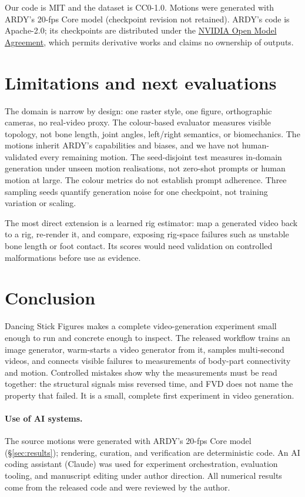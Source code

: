\documentclass[11pt]{article}
\begin{document}
Our code is MIT and the dataset is CC0-1.0. Motions were generated with ARDY's 20-fps Core model (checkpoint
revision not retained). ARDY's code is Apache-2.0; its checkpoints are distributed under the
\href{https://www.nvidia.com/en-us/agreements/enterprise-software/nvidia-open-model-agreement/}{NVIDIA Open
Model Agreement}, which permits derivative works and claims no ownership of outputs.

\section{Limitations and next evaluations}\label{sec:future}
The domain is narrow by design: one raster style, one figure, orthographic cameras, no real-video proxy. The
colour-based evaluator measures visible topology, not bone length, joint angles, left/right semantics, or
biomechanics. The motions inherit ARDY's capabilities and biases, and we have not human-validated every
remaining motion. The seed-disjoint test measures in-domain generation under unseen motion realisations, not
zero-shot prompts or human motion at large. The colour metrics do not establish prompt adherence. Three
sampling seeds quantify generation noise for one checkpoint, not training variation or scaling.

The most direct extension is a learned rig estimator: map a generated video back to a rig, re-render it, and
compare, exposing rig-space failures such as unstable bone length or foot contact. Its scores would need
validation on controlled malformations before use as evidence.

\section{Conclusion}
Dancing Stick Figures makes a complete video-generation experiment small enough to run and concrete enough to
inspect. The released workflow trains an image generator, warm-starts a video generator from it, samples
multi-second videos, and connects visible failures to measurements of body-part connectivity and motion.
Controlled mistakes show why the measurements must be read together: the structural signals miss reversed time,
and FVD does not name the property that failed. It is a small, complete first experiment in video generation.

\paragraph{Use of AI systems.} The source motions were generated with ARDY's 20-fps Core model
(\S\ref{sec:results}); rendering, curation, and verification are deterministic code. An AI coding assistant
(Claude) was used for experiment orchestration, evaluation tooling, and manuscript editing under author
direction. All numerical results come from the released code and were reviewed by the author.
\end{document}
